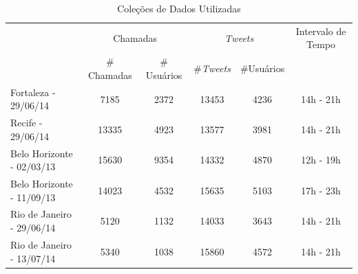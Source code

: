 \documentclass[10pt, a4paper, onecolumn, conference, compsocconf]{IEEEtran}
\begin{document}
\begin{table} [ttt!]%
\large
\centering
\caption{Coleções de Dados Utilizadas}
\label{tabela1} 
\begin{tabular}{c|c|c|c|c|c|} 
\cline{2-6} 
& \multicolumn{2}{c|}{Chamadas} & \multicolumn{2}{|c|}{\textit{Tweets}} & {Intervalo de Tempo}\\
\cline{2-5} 
& \# Chamadas & \# Usuários & \#\textit{Tweets} & \#Usuários &\\
\hline
\multicolumn{1}{|l|}{Fortaleza - 29/06/14} & 7185 & 2372 & 13453 & 4236  & 14h - 21h\\
\multicolumn{1}{|l|}{Recife - 29/06/14} & 13335 & 4923 & 13577 & 3981 & 14h - 21h\\
\multicolumn{1}{|l|}{Belo Horizonte - 02/03/13} & 15630 & 9354 & 14332 & 4870 & 12h - 19h\\ 
\multicolumn{1}{|l|}{Belo Horizonte - 11/09/13} & 14023 & 4532 & 15635 & 5103 & 17h - 23h\\
\multicolumn{1}{|l|}{Rio de Janeiro - 29/06/14} & 5120 & 1132 & 14033 & 3643 & 14h - 21h\\
\multicolumn{1}{|l|}{Rio de Janeiro - 13/07/14} & 5340 & 1038 & 15860 & 4572 & 14h - 21h \\
\hline
\end{tabular}
\end{table}


\end{document}
